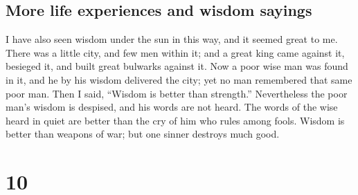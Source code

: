 \hypertarget{more-life-experiences-and-wisdom-sayings}{%
\subsection{More life experiences and wisdom
sayings}\label{more-life-experiences-and-wisdom-sayings}}

 I have also seen wisdom under the sun in this way, and
it seemed great to me.  There was a little city, and few
men within it; and a great king came against it, besieged it, and built
great bulwarks against it.  Now a poor wise man was found
in it, and he by his wisdom delivered the city; yet no man remembered
that same poor man.  Then I said, ``Wisdom is better than
strength.'' Nevertheless the poor man's wisdom is despised, and his
words are not heard.  The words of the wise heard in
quiet are better than the cry of him who rules among fools.
 Wisdom is better than weapons of war; but one sinner
destroys much good.

\hypertarget{section-9}{%
\section{10}\label{section-9}}

